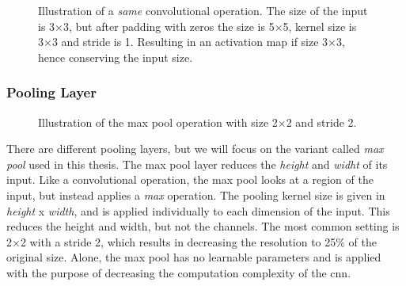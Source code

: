    \begin{figure}[H]
        \centering
        
        \caption[Same convolution example]{Illustration of a \textit{same} convolutional operation. The size of the input is 3×3, but after padding with zeros the size is 5×5, kernel size is 3×3 and stride is 1. Resulting in an activation map if size 3×3, hence conserving the input size.}
      	\medskip 
        \label{same_convolutional_fig}
    \end{figure}
    
    
    
\subsubsection{Pooling Layer}

    \begin{figure}[H]
        \centering
                
        \caption[The max pool operation]{Illustration of the max pool operation with size 2×2 and stride 2.}
      	\medskip 
        \label{maxpool_fig}
    \end{figure}
    There are different pooling layers, but we will focus on the variant called \textit{max pool} used in this thesis. The max pool layer reduces the \textit{height} and \textit{widht} of its input\cite{o2015introduction_convolutions}. Like a convolutional operation, the max pool looks at a region of the input, but instead applies a \textit{max} operation. The pooling kernel size is given in \textit{height} x \textit{width}, and is applied individually to each dimension of the input. This reduces the height and width, but not the channels. The most common setting is 2×2 with a stride 2, which results in decreasing the resolution to 25\% of the original size. Alone, the max pool has no learnable parameters and is applied with the purpose of decreasing the computation complexity of the \gls{cnn}.


